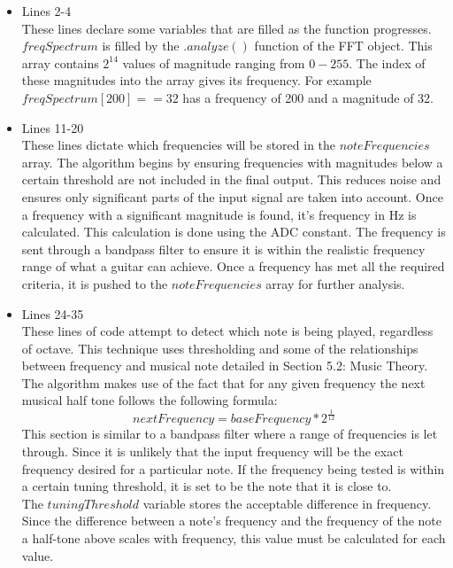 \documentclass[12pt,a4paper]{article}
\begin{document}
		\begin{itemize}
			\item Lines 2-4\\
					These lines declare some variables that are filled as the function progresses. $freqSpectrum$ is filled by the $.analyze()$ function of the FFT object. This array contains $2^{14}$
						values of magnitude ranging from $0-255$. The index of these magnitudes into the array gives its frequency. For example $freqSpectrum[200] == 32$ has a frequency of 200 and a 
						magnitude of 32.
			\item Lines 11-20\\
					These lines dictate which frequencies will be stored in the $noteFrequencies$ array. The algorithm begins by ensuring frequencies with magnitudes below a certain threshold are 
					not included in the final output. This reduces noise and ensures only significant parts of the input signal are taken into account. Once a frequency with a significant magnitude
					is found, it's frequency in Hz is calculated. This calculation is done using the ADC constant.
					The frequency is sent through a bandpass filter to ensure it is within the realistic frequency range of what a guitar can achieve.
					Once a frequency has met all the required criteria, it is pushed to the $noteFrequencies$ array for further analysis.
			\item Lines 24-35\\
					These lines of code attempt to detect which note is being played, regardless of octave. This technique uses thresholding and some of the relationships between frequency and musical
					note detailed in Section 5.2: Music Theory.\\
					The algorithm makes use of the fact that for any given frequency the next musical half tone follows the following formula:
					$$
						nextFrequency = baseFrequency * 2^{\frac{1}{12}}
					$$
					This section is similar to a bandpass filter where a range of frequencies is let through. Since it is unlikely that the input frequency will be the exact frequency
					desired for a particular note. If the frequency being tested is within a certain tuning threshold, it is set to be the note that it is close to. \\
					The $tuningThreshold$ variable stores the acceptable difference in frequency. Since the difference between a note's frequency and the frequency of the note a half-tone
					above scales with frequency, this value must be calculated for each value.\\

\end{itemize}
\end{document}
